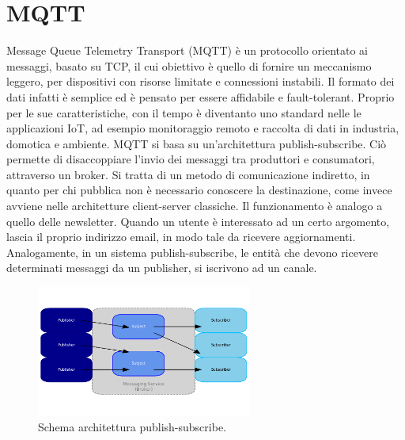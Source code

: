 \section{MQTT} %
Message Queue Telemetry Transport (MQTT) è un protocollo orientato ai messaggi, basato su TCP, il cui obiettivo è quello di fornire un meccanismo leggero, per dispositivi con risorse limitate e connessioni instabili. Il formato dei dati infatti è semplice ed è pensato per essere affidabile e fault-tolerant. Proprio per le sue caratteristiche, con il tempo è diventanto uno standard nelle le applicazioni IoT, ad esempio monitoraggio remoto e raccolta di dati in industria, domotica e ambiente. MQTT si basa su un'architettura publish-subscribe. Ciò permette di disaccoppiare l'invio dei messaggi tra produttori e consumatori, attraverso un broker. Si tratta di un metodo di comunicazione indiretto, in quanto per chi pubblica non è necessario conoscere la destinazione, come invece avviene nelle architetture client-server classiche. Il funzionamento è analogo a quello delle newsletter. Quando un utente è interessato ad un certo argomento, lascia il proprio indirizzo email, in modo tale da ricevere aggiornamenti. Analogamente, in un sistema publish-subscribe, le entità che devono ricevere determinati messaggi da un publisher, si iscrivono ad un canale. 

\begin{figure}[htbp]
    \centering
    \includegraphics[width=0.63\textwidth]{figures/pub-sub-arch.png}
    \caption{Schema architettura publish-subscribe.}
    \label{fig:pub-sub}
\end{figure}

